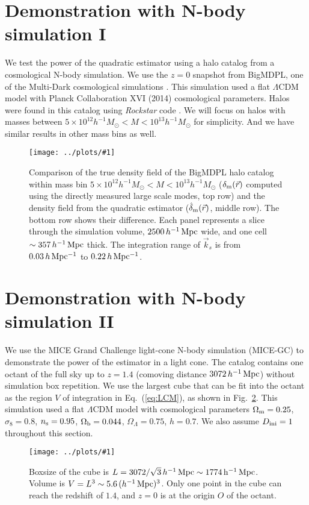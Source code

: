 \documentclass[prd,amsmath,amssymb,floatfix,superscriptaddress,nofootinbib,twocolumn]{revtex4-1}
\newcommand{\ini}{\rm ini}
\newcommand{\vrr}{\vec{r}}
\newcommand{\vk}{\vec{k}}
\newcommand{\ec}[1]{Eq.~(\ref{eq:#1})}
\newcommand{\rf}[1]{\ref{fig:#1}}
\newcommand{\sfig}[2]{
\texttt{[image: ../plots/\#1]}
        }
\newcommand{\Sfig}[2]{
   \begin{figure}[thbp]
   \begin{center}
    \sfig{../plots/#1.pdf}{\columnwidth}
    \caption{{\small #2}}
    \label{fig:#1}
     \end{center}
   \end{figure}
}
\begin{document}
 
\section{Demonstration with N-body simulation I} \label{sec5}
 We test the power of the quadratic estimator using a halo catalog from a cosmological N-body simulation. We use the $z=0$ snapshot from BigMDPL, one of the Multi-Dark cosmological simulations \cite{Klypin:2014nov}. This simulation used a flat $\Lambda$CDM model with Planck Collaboration XVI (2014) \cite{Planck:2014cos} cosmological parameters. Halos were found in this catalog using \textit{Rockstar} code \cite{Behroozi:2013Rock}. We will focus on halos with masses between $5 \times 10^{12}h^{-1}M_{\odot}<M < 10^{13}h^{-1}M_{\odot}$ for simplicity. And we have similar results in other mass bins as well.
 
\Sfig{real_snap}{Comparison of the true density field of the BigMDPL halo catalog within mass bin $5 \times 10^{12}h^{-1}M_{\odot}<M < 10^{13}h^{-1}M_{\odot}$ ($\delta_{\rm m}(\vrr)$ computed using the directly measured large scale modes, top row) and the density field from the quadratic estimator ($\hat{\delta}_{\rm m}(\vrr)$, middle row). The bottom row shows their difference. Each panel represents a slice through the simulation volume, $2500\,h^{-1}\rm \, Mpc$ wide, and one cell $\sim 357\,h^{-1}\rm \, Mpc$ thick. The integration range of $\vk_{s}$ is from $0.03\, h \rm \, Mpc^{-1}$ to $0.22\, h \rm \, Mpc^{-1}$.}
\section{Demonstration with N-body simulation II} \label{sec6}
We use the MICE Grand Challenge light-cone N-body simulation (MICE-GC) \cite{Fosalba:2015MI}\cite{Fosalba:2015MII} to demonstrate the power of the estimator in a light cone. The catalog contains one octant of the full sky up to $z = 1.4$ (comoving distance $3072\, h^{-1}\, \rm Mpc$) without simulation box repetition. We use the largest cube that can be fit into the octant as the region $V$ of integration in \ec{LCM}, as shown in Fig.~\rf{Cube}. This simulation used a flat $\Lambda$CDM model with cosmological parameters $ \Omega_{\rm m}=0.25$, $\sigma_8 = 0.8$, $n_{\rm s}=0.95$, $\Omega_{\rm b}=0.044$, $\Omega_{\Lambda}=0.75$, $h=0.7$. We also assume $D_{\ini}=1$ throughout this section.

\Sfig{Cube}{Boxsize of the cube is $L=3072/\sqrt{3}\, h^{-1}\, \rm Mpc\sim 1774\, h^{-1}\, \rm Mpc$. Volume is $V=L^3\sim 5.6\,(h^{-1}\,\rm Mpc)^3$. Only one point in the cube can reach the redshift of $1.4$, and $z=0$ is at the origin $O$ of the octant.}
\end{document}
